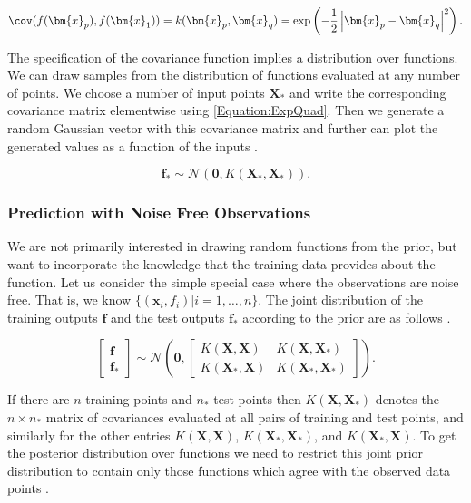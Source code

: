 \documentclass[../../../main.tex]{subfiles}
\begin{document}
\begin{equation}
\cov(f(\bm{x}_p),f(\bm{x}_1)) = k(\bm{x}_p,\bm{x}_q) = \exp\left(-\frac{1}{2}\left|\bm{x}_p-\bm{x}_q\right|^2\right).
\label{Equation:ExpQuad}
\end{equation}

The specification of the covariance function implies a distribution over functions. We can draw samples from the distribution of functions evaluated at any number of points. We choose a number of input points $\bm{X}_\ast$ and write the corresponding covariance matrix elementwise using \autoref{Equation:ExpQuad}. Then we generate a random Gaussian vector with this covariance matrix and further can plot the generated values as a function of the inputs \autocite{Rasmussen2005}.

\begin{equation}
\bm{f}_\ast \sim \mathcal{N}(\bm{0}, K(\bm{X}_\ast,\bm{X}_\ast)).
\end{equation}

\subsubsection{Prediction with Noise Free Observations}

We are not primarily interested in drawing random functions from the prior, but want to incorporate the knowledge that the training data provides about the function. Let us consider the simple special case where the observations are noise free. That is, we know $\{(\bm{x}_i,f_i)|i=1,\ldots,n\}$. The joint distribution of the training outputs $\bm{f}$ and the test outputs $\bm{f}_\ast$ according to the prior are as follows \autocite{Rasmussen2005}.

\begin{equation}
\begin{bmatrix}
\bm{f} \\
\bm{f}_\ast
\end{bmatrix}
\sim\mathcal{N}\left(\bm{0},
\begin{bmatrix}
K(\bm{X},\bm{X}) & K(\bm{X},\bm{X}_\ast) \\
K(\bm{X}_\ast,\bm{X}) & K(\bm{X}_\ast,\bm{X}_\ast)
\end{bmatrix}
\right).
\end{equation}

If there are $n$ training points and $n_\ast$ test points then $K(\bm{X},\bm{X}_\ast)$ denotes the $n \times n_\ast$ matrix of covariances evaluated at all pairs of training and test points, and similarly for the other entries $K(\bm{X},\bm{X})$, $K(\bm{X}_\ast,\bm{X}_\ast)$, and $K(\bm{X}_\ast,\bm{X})$. To get the posterior distribution over functions we need to restrict this joint prior distribution to contain only those functions which agree with the observed data points \autocite{Rasmussen2005}.
\end{document}

